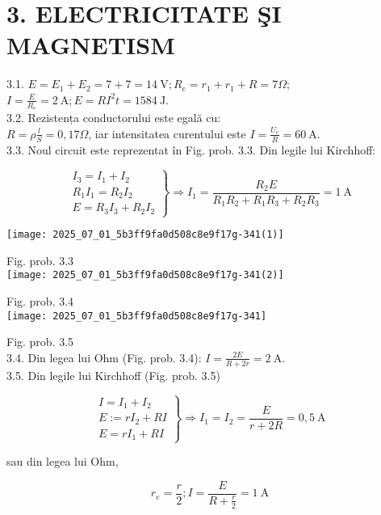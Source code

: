 
\section*{3. ELECTRICITATE ŞI MAGNETISM}
3.1. $E=E_{1}+E_{2}=7+7=14 \mathrm{~V} ; R_{e}=r_{1}+r_{1}+R=7 \Omega$;\\
$I=\frac{E}{R_{e}}=2 \mathrm{~A} ; E=R I^{2} t=1584 \mathrm{~J}$.\\
3.2. Rezistența conductorului este egală cu:\\
$R=\rho \frac{l}{S}=0,17 \Omega$, iar intensitatea curentului este $I=\frac{U_{c}}{R}=60 \mathrm{~A}$.\\
3.3. Noul circuit este reprezentat în Fig. prob. 3.3. Din legile lui Kirchhoff:

$$
\left.\begin{array}{l}
I_{3}=I_{1}+I_{2} \\
R_{1} I_{1}=R_{2} I_{2} \\
E=R_{3} I_{3}+R_{2} I_{2}
\end{array}\right\} \Rightarrow I_{1}=\frac{R_{2} E}{R_{1} R_{2}+R_{1} R_{3}+R_{2} R_{3}}=1 \mathrm{~A}
$$

\begin{center}
\texttt{[image: 2025\_07\_01\_5b3ff9fa0d508c8e9f17g-341(1)]}
\end{center}

Fig. prob. 3.3\\
\texttt{[image: 2025\_07\_01\_5b3ff9fa0d508c8e9f17g-341(2)]}

Fig. prob. 3.4\\
\texttt{[image: 2025\_07\_01\_5b3ff9fa0d508c8e9f17g-341]}

Fig. prob. 3.5\\
3.4. Din legea lui Ohm (Fig. prob. 3.4): $I=\frac{2 E}{R+2 r}=2 \mathrm{~A}$.\\
3.5. Din legile lui Kirchhoff (Fig. prob. 3.5)

$$
\left.\begin{array}{l}
I=I_{1}+I_{2} \\
E:=r I_{2}+R I \\
E=r I_{1}+R I
\end{array}\right\} \Rightarrow I_{1}=I_{2}=\frac{E}{r+2 R}=0,5 \mathrm{~A}
$$

sau din legea lui Ohm,

$$
r_{e}=\frac{r}{2} ; I=\frac{E}{R+\frac{r}{2}}=1 \mathrm{~A}
$$

